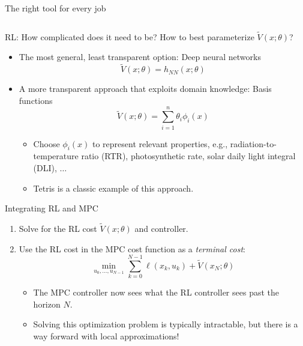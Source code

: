 \documentclass[xcolor=dvipsnames,aspectratio=169]{beamer}
\begin{document}
\begin{frame}{The right tool for every job}
\begin{columns}
\begin{column}{0.48\linewidth}
		\end{column}
	\end{columns}
\end{frame}

\begin{frame}{RL: How complicated does it need to be?}
	How to best parameterize $\tilde{V}(x;\theta)$?
	\begin{itemize}
		\item The most general, least transparent option: Deep neural networks 
	\begin{equation*}
		\tilde{V}(x;\theta) = h_{NN}(x;\theta) 
	\end{equation*}
	\pause
		\item A more transparent approach that exploits domain knowledge: 
		Basis functions
	\begin{equation*}
		\tilde{V}(x;\theta) = \sum_{i=1}^{n}\theta_i \phi_i(x)
	\end{equation*}
		\begin{itemize}
			\item Choose $\phi_i(x)$ to represent relevant properties, e.g., 
			radiation-to-temperature ratio (RTR), photosynthetic rate, solar 
			daily light integral (DLI), $\dots$ 
			\item Tetris is a classic example of this approach.
		\end{itemize}
	\end{itemize}
\end{frame}

\begin{frame}{Integrating RL and MPC}
	\begin{enumerate}
		\item Solve for the RL cost $\tilde{V}(x;\theta)$ and controller.
		\item Use the RL cost in the MPC cost function as a \textit{terminal 
		cost}: 
		\begin{equation*}
			\min_{u_0,\dots,u_{N-1}} \sum_{k=0}^{N-1} \ell(x_k,u_k) + 
			\tilde{V}(x_N;\theta)
		\end{equation*}
		\begin{itemize}
			\item The MPC controller now sees what the RL controller sees past 
			the horizon $N$. 
			\item Solving this optimization problem is typically intractable, 
			but there is a way forward with local approximations!
		\end{itemize} 
	\end{enumerate}
\end{frame}
\end{document}
